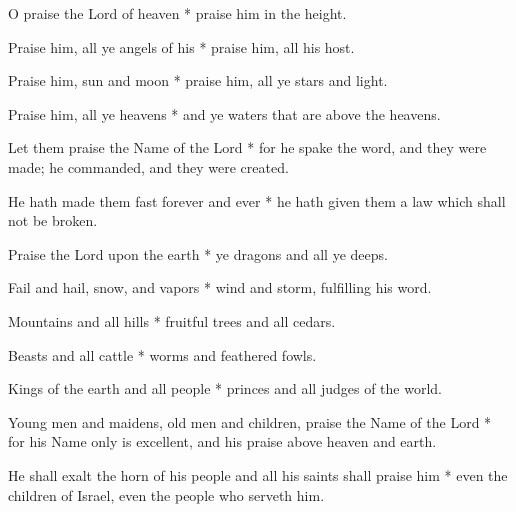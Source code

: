 O praise the Lord of heaven * praise him in the height.

Praise him, all ye angels of his * praise him, all his host.

Praise him, sun and moon * praise him, all ye stars and light.

Praise him, all ye heavens * and ye waters that are above the heavens.

Let them praise the Name of the Lord * for he spake the word, and they were made; he commanded, and they were created.

He hath made them fast forever and ever * he hath given them a law which shall not be broken.

Praise the Lord upon the earth * ye dragons and all ye deeps.

Fail and hail, snow, and vapors * wind and storm, fulfilling his word.

Mountains and all hills * fruitful trees and all cedars.

Beasts and all cattle * worms and feathered fowls.

Kings of the earth and all people * princes and all judges of the world.

Young men and maidens, old men and children, praise the Name of the Lord * for his Name only is excellent, and his praise above heaven and earth.

He shall exalt the horn of his people and all his saints shall praise him * even the children of Israel, even the people who serveth him.